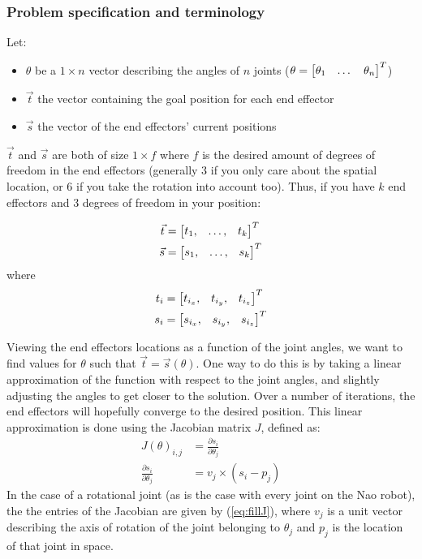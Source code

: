 \documentclass[a4paper]{article}
\begin{document}
\subsubsection{Problem specification and terminology}
Let:
\begin{itemize}
    \item $\theta$ be a $1 \times n$ vector describing the angles of $n$ joints
        ($\theta = \begin{bmatrix} \theta_1 & \dots & \theta_n \end{bmatrix}^T$)
    \item $\vec{t}$ the vector containing the goal position for each end effector
    \item $\vec{s}$ the vector of the end effectors' current positions
\end{itemize}

$\vec{t}$ and $\vec{s}$ are both of size $1 \times f$ where $f$ is the
desired amount of degrees of freedom in the end effectors (generally 3
if you only care about the spatial location, or 6 if you take the
rotation into account too).  Thus, if you have $k$ end effectors and 3
degrees of freedom in your position:

\begin{align*}
    \vec{t} &= \begin{bmatrix} t_1, &\dots, &t_k \end{bmatrix}^T \\
    \vec{s} &= \begin{bmatrix} s_1, &\dots, &s_k \end{bmatrix}^T
\end{align*}
where
\begin{align*}
    t_i &= \begin{bmatrix} t_{i_{x}}, &t_{i_{y}}, &t_{i_{z}} \end{bmatrix}^T \\
    s_i &= \begin{bmatrix} s_{i_{x}}, &s_{i_{y}}, &s_{i_{z}} \end{bmatrix}^T
\end{align*}

Viewing the end effectors locations as a function of the joint angles,
we want to find values for $\theta$ such that $\vec{t} =
\vec{s}(\theta)$. One way to do this is by taking a linear
approximation of the function with respect to the joint angles, and
slightly adjusting the angles to get closer to the solution.  Over a
number of iterations, the end effectors will hopefully converge to the
desired position.  This linear approximation is done using the
Jacobian matrix $J$, defined as:
\begin{align}
  J(\theta)_{i, j} &= \frac{\partial s_i}{\partial \theta_j} \\
  \frac{\partial s_i}{\partial \theta_j} &= v_j \times (s_i - p_j)    \label{eq:fillJ}
\end{align}
In the case of a rotational joint (as is the case with every joint on
the Nao robot), the the entries of the Jacobian are given by
(\ref{eq:fillJ}), where $v_j$ is a unit vector describing the axis of
rotation of the joint belonging to $\theta_j$ and $p_j$ is the
location of that joint in space.
\end{document}
